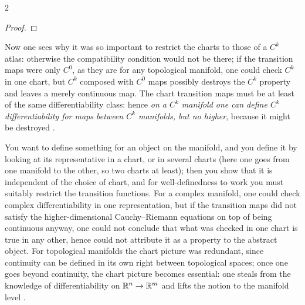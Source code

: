 \begin{paracol}{2}
\begin{proof}
\end{proof}
Now one sees why it was so important to restrict the charts to those of a $C^k$ atlas: otherwise the compatibility condition would not be there; if the transition maps were only $C^0$, as they are for any topological manifold, one could check $C^k$ in one chart, but $C^k$ composed with $C^0$ maps
possibly destroys the $C^k$ property and leaves a merely continuous map. The chart transition maps must be at least of the same differentiability class: hence \emph{on a $C^k$ manifold one can define $C^k$ differentiability for maps between $C^k$ manifolds, but no higher}, because it might be
destroyed .

\begin{intuition}\label{int:df-philosophy}
You want to define something for an object on the manifold, and you define it by looking at its representative in a chart, or in several charts (here one goes from one manifold to the other, so two charts at least); then you show that it is independent of the choice of chart, and for
well-definedness to work you must suitably restrict the transition functions. For a complex manifold, one could check complex differentiability in one representation, but if the transition maps did not satisfy the higher-dimensional Cauchy--Riemann equations on top of being continuous anyway, one could not conclude that what was
checked in one chart is true in any other, hence could not attribute it as a property to the abstract object. For topological manifolds the chart picture was redundant, since continuity can be defined in its own right between topological spaces; once one goes beyond continuity, the chart picture becomes essential: one
steals from the knowledge of differentiability on $\mathbb{R}^n\to\mathbb{R}^m$ and lifts the notion to the manifold level .
\end{intuition}


\end{paracol}
